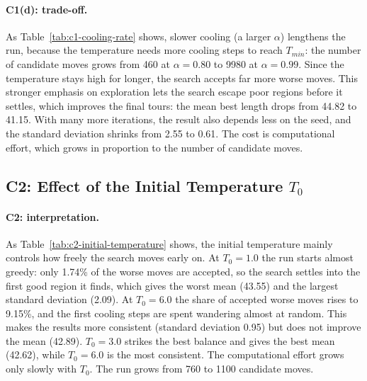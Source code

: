 \documentclass[11pt]{article}
\begin{document}
\paragraph{C1(d): trade-off.}
As Table~\ref{tab:c1-cooling-rate} shows, slower cooling (a larger $\alpha$) lengthens the run, because the temperature needs more cooling steps to reach $T_{min}$: the number of candidate moves grows from 460 at $\alpha = 0.80$ to 9980 at $\alpha = 0.99$. Since the temperature stays high for longer, the search accepts far more worse moves. This stronger emphasis on exploration lets the search escape poor regions before it settles, which improves the final tours: the mean best length drops from 44.82 to 41.15. With many more iterations, the result also depends less on the seed, and the standard deviation shrinks from 2.55 to 0.61. The cost is computational effort, which grows in proportion to the number of candidate moves.

\subsection*{C2: Effect of the Initial Temperature $T_0$}

\begin{table}[H]
    \centering
    
    \caption{C2: effect of the initial temperature $T_0$ over seeds 0--9 ($\alpha = 0.90$, $T_{min} = 0.02$, cooling every 20 candidate moves).}
    \label{tab:c2-initial-temperature}
\end{table}

\paragraph{C2: interpretation.}
As Table~\ref{tab:c2-initial-temperature} shows, the initial temperature mainly controls how freely the search moves early on. At $T_0 = 1.0$ the run starts almost greedy: only 1.74\% of the worse moves are accepted, so the search settles into the first good region it finds, which gives the worst mean (43.55) and the largest standard deviation (2.09). At $T_0 = 6.0$ the share of accepted worse moves rises to 9.15\%, and the first cooling steps are spent wandering almost at random. This makes the results more consistent (standard deviation 0.95) but does not improve the mean (42.89). $T_0 = 3.0$ strikes the best balance and gives the best mean (42.62), while $T_0 = 6.0$ is the most consistent. The computational effort grows only slowly with $T_0$. The run grows from 760 to 1100 candidate moves.
\end{document}
